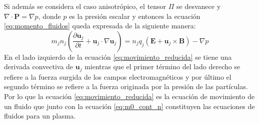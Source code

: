 \documentclass[../tesis_main_file.tex]{subfiles}
\begin{document}
Si además se considera el caso anisotrópico, el tensor $\Pi$ se desvanece y $\nabla \cdot \textbf{P}=\nabla p$, donde $p$ es la presión escalar y entonces la ecuación \ref{eq:momento_fluidos} queda expresada de la siguiente manera:
\begin{equation}
\label{eq:movimiento_reducida}
m_jn_j \left( \frac{\partial \textbf{u}_j}{\partial t}+\textbf{u}_j\cdot \nabla \textbf{u}_j \right)= n_jq_j(\textbf{E}+\textbf{u}_j\times \textbf{B})- \nabla p
\end{equation}
En el lado izquierdo de la ecuación \ref{eq:movimiento_reducida} se tiene una derivada convectiva de $\textbf{u}_j$ mientras que el primer término del lado derecho se refiere a la fuerza surgida de los campos electromagnéticos y por último el segundo término se refiere a la fuerza originada por la presión de las partículas.
Por lo que la ecuación \ref{eq:movimiento_reducida} es la ecuación de movimiento de un fluido que junto con la ecuación \ref{eq:m0_cont_n} constituyen las ecuaciones de fluidos para un plasma.
\end{document}
